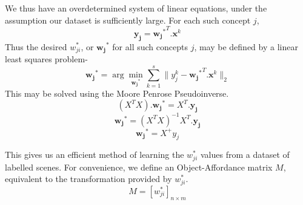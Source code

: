 

We thus have an overdetermined system of linear equations, under the assumption our dataset is sufficiently large. For each such concept $j$,
\begin{equation}
\mathbf{y_j}={\mathbf{w_j}^*}^T.\mathbf{x}^k
\end{equation}
Thus the desired $w_{ji}^*$, or $\mathbf{w_j}^*$ for all such concepts $j$, may be defined by a linear least squares problem- 
\begin{equation}
\mathbf{w_{j}}^* = \arg\min_{\mathbf{w_{j}}^*} \sum_{k=1}^s \| y_j^k - {\mathbf{w_{j}}^*}^T .  \mathbf{x}^k \|_2
\end{equation}
This may be solved using the Moore Penrose Pseudoinverse. 
\begin{equation}
(X^T X) .\mathbf{w_j}^* = X^T .\mathbf{y_j}
\end{equation}
\begin{equation}
\mathbf{w_j}^* = (X^T X)^{-1} X^T .\mathbf{y_j}
\end{equation}
\begin{equation}
\mathbf{w_j}^* = X^+ y_j
\end{equation}

This gives us an efficient method of learning the $w_{ji}^*$ values from a dataset of labelled scenes. For convenience, we define an Object-Affordance matrix $M$, equivalent to the transformation provided by $w_{ji}^*$.
$$M=[w_{ji}^*]_{n \times m}$$

